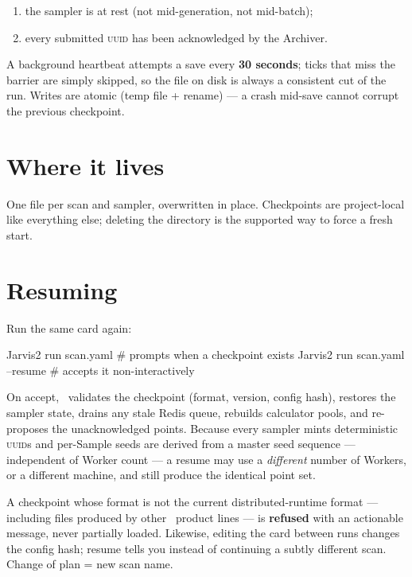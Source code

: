 \begin{enumerate}
  \item the sampler is at rest (not mid-generation, not mid-batch);
  \item every submitted \textsc{uuid} has been acknowledged by the Archiver.
\end{enumerate}

A background heartbeat attempts a save every \textbf{30 seconds}; ticks that miss the
barrier are simply skipped, so the file on disk is always a consistent cut of the run.
Writes are atomic (temp file + rename) --- a crash mid-save cannot corrupt the previous
checkpoint.

\section{Where it lives}
\label{sec:checkpoint-location}

\begin{quote}
\end{quote}

One file per scan and sampler, overwritten in place. Checkpoints are project-local like
everything else; deleting the directory is the supported way to force a fresh start.

\section{Resuming}
\label{sec:resuming}

Run the same card again:

\begin{terminal}
\begin{jcmd}
Jarvis2 run scan.yaml            # prompts when a checkpoint exists
Jarvis2 run scan.yaml --resume   # accepts it non-interactively
\end{jcmd}
\end{terminal}

On accept, \Jtwo\ validates the checkpoint (format, version, config hash), restores the
sampler state, drains any stale Redis queue, rebuilds calculator pools, and re-proposes
the unacknowledged points. Because every sampler mints deterministic \textsc{uuid}s and
per-Sample seeds are derived from a master seed sequence --- independent of Worker count
--- a resume may use a \emph{different} number of Workers, or a different machine, and
still produce the identical point set.

\begin{jwarn}
A checkpoint whose format is not the current distributed-runtime format --- including
files produced by other \Jarvis\ product lines --- is \textbf{refused} with an
actionable message, never partially loaded. Likewise, editing the card between runs
changes the config hash; resume tells you instead of continuing a subtly different
scan. Change of plan = new scan name.
\end{jwarn}

